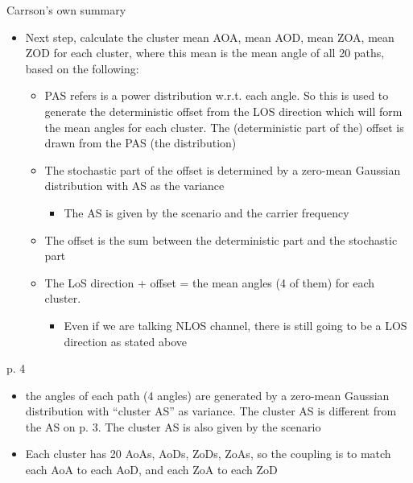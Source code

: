 \documentclass{beamer}
\begin{document}
\begin{frame}[allowframebreaks]{Carrson's own summary}
\begin{itemize}
	\item Next step, calculate the cluster mean AOA, mean AOD, mean ZOA, mean ZOD for each cluster, where this mean is the mean angle of all 20 paths, based on the following:
	\begin{itemize}
		\item PAS refers is a power distribution w.r.t. each angle.  So this is used to generate the deterministic offset from the LOS direction which will form the mean angles for each cluster.  The (deterministic part of the) offset is drawn from the PAS (the distribution)
		\item The stochastic part of the offset is determined by a zero-mean Gaussian distribution with AS as the variance
		\begin{itemize}
			\item The AS is given by the scenario and the carrier frequency
		\end{itemize}
		\item The offset is the sum between the deterministic part and the stochastic part
		\item The LoS direction + offset = the mean angles (4 of them) for each cluster.
		\begin{itemize}
			\item Even if we are talking NLOS channel, there is still going to be a LOS direction as stated above
		\end{itemize}
	\end{itemize}
\end{itemize}

p. 4 \\
\begin{itemize}
	\item the angles of each path (4 angles) are generated by a  zero-mean Gaussian distribution with ``cluster AS'' as variance.  The cluster AS is different from the AS on p. 3.  The cluster AS is also given by the scenario
	\item Each cluster has 20 AoAs, AoDs, ZoDs, ZoAs, so the coupling is to match each AoA to each AoD, and each ZoA to each ZoD
\end{itemize}



\end{frame}
\end{document}
